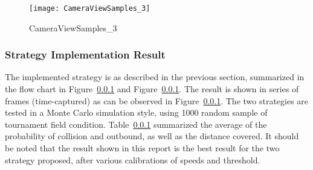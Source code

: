 \begin{figure}
\texttt{[image: CameraViewSamples\_3]}
\centering
\caption{CameraViewSamples_3}
\label{f:CameraViewSamples}
\end{figure} 

\subsubsection{Strategy Implementation Result}
The implemented strategy is as described in the previous section, summarized in the flow chart in Figure~\ref{} and Figure~\ref{}. The result is shown in series of frames (time-captured) as can be observed in Figure~\ref{}. The two strategies are tested in a Monte Carlo simulation style, using 1000 random sample of tournament field condition. Table~\ref{} summarized the average of the probability of collision and outbound, as well as the distance covered. It should be noted that the result shown in this report is the best result for the two strategy proposed, after various calibrations of speeds and threshold. 


